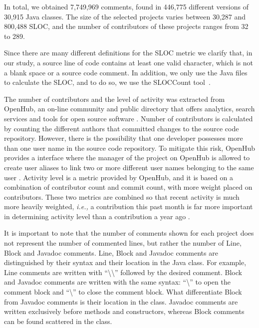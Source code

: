 In total, we obtained 7,749,969 comments, found in 446,775 different versions of 30,915 Java classes. The size of the selected projects varies between 30,287 and 800,488 SLOC, and the number of contributors of these projects ranges from 32 to 289. 

Since there are many different definitions for the SLOC metric we clarify that, in our study, a source line of code contains at least one valid character, which is not a blank space or a source code comment. In addition, we only use the Java files to calculate the SLOC, and to do so, we use the SLOCCount tool~\cite{wheeler2004:home}. 

The number of contributors and the level of activity was extracted from OpenHub, an on-line community and public directory that offers analytics, search services and tools for open source software \cite{Openhub:home}. Number of contributors is calculated by counting the different authors that committed changes to the source code repository. However, there is the possibility that one developer possesses more than one user name in the source code repository. To mitigate this risk, OpenHub provides a interface where the manager of the project on OpenHub is allowed to create user aliases to link two or more different user names belonging to the same user \cite{Openhub:Aliases}. Activity level is a metric provided by OpenHub, and it is based on a combination of contributor count and commit count, with more weight placed on contributors. These two metrics are combined so that recent activity is much more heavily weighted, \textit{i.e.,} a contribution this past month is far more important in determining activity level than a contribution a year ago \cite{Openhub:activity_level}. 

It is important to note that the number of comments shown for each project does not represent the number of commented lines, but rather the number of Line, Block and Javadoc comments. Line, Block and Javadoc comments are distinguished by their syntax and their location in the Java class. For example, Line comments are written with ``\textbackslash\textbackslash'' followed by the desired comment. Block and Javadoc comments are written with the same syntax: ``\text{*}\text{*}\textbackslash'' to open the comment block and ``\text{*}\textbackslash'' to close the comment block. What differentiate Block from Javadoc comments is their location in the class. Javadoc comments are written exclusively before methods and constructors, whereas Block comments can be found scattered in the class.  

